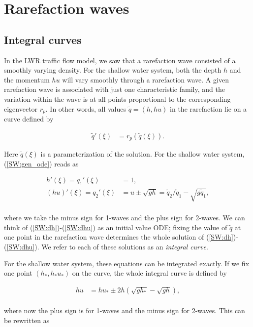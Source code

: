 \documentclass{SIAMbook2016}
\begin{document}
\hypertarget{rarefaction-waves}{%
\section{Rarefaction waves}\label{rarefaction-waves}}

\hypertarget{integral-curves}{%
\subsection{Integral curves}\label{integral-curves}}

In the LWR traffic flow model, we saw that a rarefaction wave consisted
of a smoothly varying density. For the shallow water system, both the
depth \(h\) and the momentum \(hu\) will vary smoothly through a
rarefaction wave. A given rarefaction wave is associated with just one
characteristic family, and the variation within the wave is at all
points proportional to the corresponding eigenvector \(r_p\). In other
words, all values \(\tilde{q}=(h,hu)\) in the rarefaction lie on a curve
defined by

\begin{align} \label{SW:gen_ode}
    \tilde{q}'(\xi) & = r_p(\tilde{q}(\xi)).
\end{align}

Here \(\tilde{q}(\xi)\) is a parameterization of the solution. For the
shallow water system, (\ref{SW:gen_ode}) reads as

\begin{align}
    h'(\xi)    = q_1'(\xi) & = 1 \label{SW:dh}, \\
    (hu)'(\xi) = q_2'(\xi) & = u \pm \sqrt{gh} = \tilde{q}_2/\tilde{q}_1 - \sqrt{g\tilde{q}_1}, \label{SW:dhu}
\end{align}\\
where we take the minus sign for 1-waves and the plus sign for 2-waves.
We can think of (\ref{SW:dh})-(\ref{SW:dhu}) as an initial value ODE;
fixing the value of \(\tilde{q}\) at one point in the rarefaction wave
determines the whole solution of (\ref{SW:dh})-(\ref{SW:dhu}). We refer
to each of these solutions as an \emph{integral curve}.

For the shallow water system, these equations can be integrated exactly.
If we fix one point \((h_*, h_*u_*)\) on the curve, the whole integral
curve is defined by

\begin{align}
    hu & = hu_* \pm 2h(\sqrt{gh_*} - \sqrt{gh}),
\end{align}\\
where now the plus sign is for 1-waves and the minus sign for 2-waves.
This can be rewritten as
\end{document}
